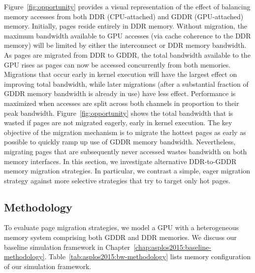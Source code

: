 Figure~\ref{fig:opportunity} provides a visual representation of the effect of
balancing memory accesses from both DDR (CPU-attached) and GDDR (GPU-attached)
memory. Initially, pages reside entirely in DDR memory.  Without migration, the
maximum bandwidth available to GPU accesses (via cache coherence to the DDR
memory)  will be limited by either the interconnect or DDR memory bandwidth.  As
pages are migrated from DDR to GDDR, the total bandwidth available to the GPU
rises as pages can now be accessed concurrently from both memories.  Migrations
that occur early in kernel execution will have the largest effect on improving
total bandwidth, while later migrations (after a substantial fraction of GDDR
memory bandwidth is already in use) have less effect.  Performance is maximized
when accesses are split across both channels in proportion to their peak
bandwidth.  Figure~\ref{fig:opportunity} shows the total bandwidth that is
wasted if pages are not migrated eagerly, early in kernel execution.  The key
objective of the migration mechanism is to migrate the hottest pages as early as
possible to quickly ramp up use of GDDR memory bandwidth.  Nevertheless,
migrating pages that are subsequently never accessed wastes bandwidth on both
memory interfaces.  In this section, we investigate alternative DDR-to-GDDR
memory migration strategies.  In particular, we contrast a simple, eager
migration strategy against more selective strategies that try to target only hot
pages.

\subsection{Methodology}
To evaluate page migration strategies, we model a GPU with a heterogeneous
memory system comprising both  GDDR and DDR memories. We discuss our baseline
simulation framework in Chapter~\ref{chap:asplos2015:baseline-methodology}.
%
Table~\ref{tab:asplos2015:bw-methodology} lists memory configuration of our simulation
framework.

